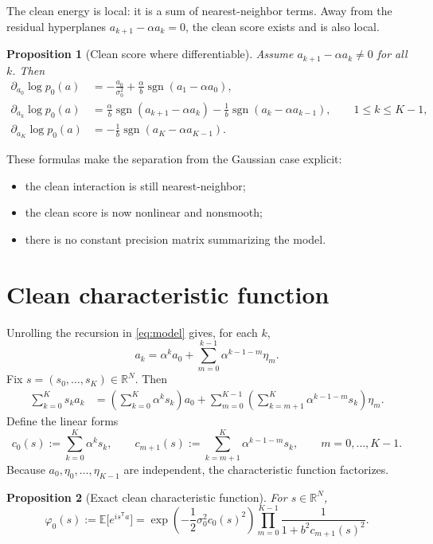 \documentclass[11pt]{article}
\newtheorem{proposition}{Proposition}[section]
\newcommand{\R}{\mathbb{R}}
\newcommand{\E}{\mathbb{E}}
\newcommand{\trans}{\mathsf{T}}
\newcommand{\sgn}{\operatorname{sgn}}
\begin{document}
The clean energy is local: it is a sum of nearest-neighbor terms. Away from the residual hyperplanes $a_{k+1}-\alpha a_k=0$, the clean score exists and is also local.
\begin{proposition}[Clean score where differentiable]\label{prop:clean_score}
Assume $a_{k+1}-\alpha a_k\ne 0$ for all $k$. Then
\begin{align}
\partial_{a_0}\log p_0(a)
&=
-\frac{a_0}{\sigma_0^2}+\frac{\alpha}{b}\sgn(a_1-\alpha a_0), \label{eq:clean_score_0}\\
\partial_{a_k}\log p_0(a)
&=
\frac{\alpha}{b}\sgn(a_{k+1}-\alpha a_k)-\frac{1}{b}\sgn(a_k-\alpha a_{k-1}),
\qquad 1\le k\le K-1, \label{eq:clean_score_mid}\\
\partial_{a_K}\log p_0(a)
&=
-\frac{1}{b}\sgn(a_K-\alpha a_{K-1}). \label{eq:clean_score_K}
\end{align}
\end{proposition}

These formulas make the separation from the Gaussian case explicit:
\begin{itemize}[leftmargin=1.5em]
\item the clean interaction is still nearest-neighbor;
\item the clean score is now nonlinear and nonsmooth;
\item there is no constant precision matrix summarizing the model.
\end{itemize}

\section{Clean characteristic function}
Unrolling the recursion in \eqref{eq:model} gives, for each $k$,
\begin{equation}\label{eq:unroll}
 a_k=\alpha^k a_0+\sum_{m=0}^{k-1}\alpha^{k-1-m}\eta_m.
\end{equation}
Fix $s=(s_0,\dots,s_K)\in\R^N$. Then
\begin{align*}
\sum_{k=0}^{K}s_k a_k
&=
\left(\sum_{k=0}^{K}\alpha^k s_k\right)a_0
+
\sum_{m=0}^{K-1}\left(\sum_{k=m+1}^{K}\alpha^{k-1-m}s_k\right)\eta_m.
\end{align*}
Define the linear forms
\begin{equation}\label{eq:c_forms}
 c_0(s):=\sum_{k=0}^{K}\alpha^k s_k,
 \qquad
 c_{m+1}(s):=\sum_{k=m+1}^{K}\alpha^{k-1-m}s_k,
 \qquad m=0,\dots,K-1.
\end{equation}
Because $a_0,\eta_0,\dots,\eta_{K-1}$ are independent, the characteristic function factorizes.
\begin{proposition}[Exact clean characteristic function]\label{prop:cf_clean}
For $s\in\R^N$,
\begin{equation}\label{eq:cf_clean}
\varphi_0(s)
:=
\E\big[e^{i s^\trans a}\big]
=
\exp\!\left(-\frac12\sigma_0^2 c_0(s)^2\right)
\prod_{m=0}^{K-1}\frac{1}{1+b^2 c_{m+1}(s)^2}.
\end{equation}
\end{proposition}
\end{document}
